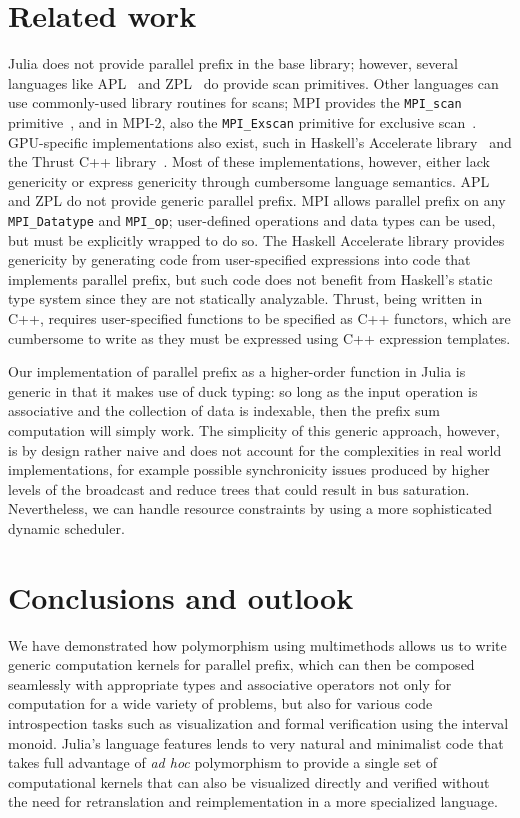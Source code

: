 \documentclass{sig-alternate}
\newcommand{\code}[1]{\texttt{#1}}
\begin{document}
\section{Related work}

Julia does not provide parallel prefix in the base library; however, several
languages like APL~\cite{Iverson1962,Iverson1979} and
ZPL~\cite{Chamberlain2000} do provide scan primitives. Other languages can use 
commonly-used library routines for scans; MPI provides the \code{MPI\_scan}
primitive~\cite{Snir1995,MPI}, and in MPI-2, also the \code{MPI\_Exscan}
primitive for exclusive scan~\cite{MPI2}. GPU-specific implementations also
exist, such in Haskell's Accelerate library~\cite{Chakravarty2011} and the
Thrust C++ library~\cite{Bell2012}. Most of these implementations, however,
either lack genericity or express genericity through cumbersome language
semantics. APL and ZPL do not provide generic parallel prefix. MPI allows
parallel prefix on any \code{MPI\_Datatype} and \code{MPI\_op}; user-defined
operations and data types can be used, but must be explicitly wrapped to do so.
The Haskell Accelerate library provides genericity by generating code from
user-specified expressions into code that implements parallel prefix, but such
code does not benefit from Haskell's static type system since they are not
statically analyzable. Thrust, being written in C++, requires user-specified
functions to be specified as C++ functors, which are cumbersome to write as
they must be expressed using C++ expression templates.

Our implementation of parallel prefix as a higher-order function in Julia is
generic in that it makes use of duck typing: so long as the input operation is
associative and the collection of data is indexable, then the prefix sum
computation will simply work. The simplicity of this generic approach, however,
is by design rather naive and does not account for the complexities in real
world implementations, for example possible synchronicity issues produced
by higher levels of the broadcast and reduce trees that could result in bus
saturation. Nevertheless, we can handle resource constraints by using a more
sophisticated dynamic scheduler.

\section{Conclusions and outlook}

We have demonstrated how polymorphism using multimethods allows us to write
generic computation kernels for parallel prefix, which can then be composed
seamlessly with appropriate types and associative operators not only for
computation for a wide variety of problems, but also for various code
introspection tasks such as visualization and formal verification using the
interval monoid. Julia's language features lends to very natural and minimalist
code that takes full advantage of \textit{ad hoc} polymorphism to provide a
single set of computational kernels that can also be visualized directly and
verified without the need for retranslation and reimplementation in a more
specialized language.
\end{document}
